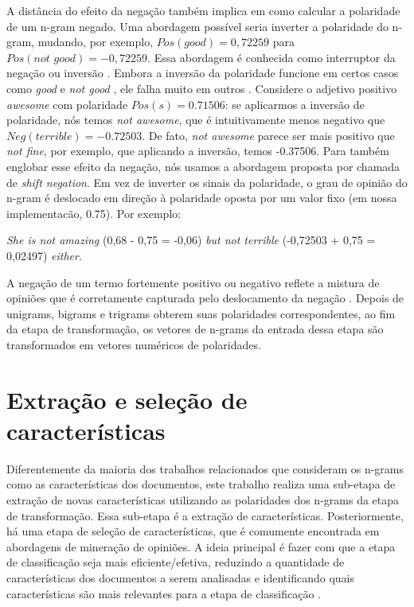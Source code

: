 A distância do efeito da negação também implica em como calcular a polaridade de um n-gram negado.  Uma abordagem possível seria inverter a polaridade do n-gram, mudando, por exemplo, $Pos(\textit{good}) = 0,72259$ para $Pos(\textit{not good}) = - 0,72259$. Essa abordagem é conhecida como interruptor da negação ou inversão \cite{sauri2008factuality}. Embora a inversão da polaridade funcione em certos casos como \textit{good} e \textit{not good} \cite{choi2008learning}, ele falha muito em outros \cite{liu2009review}. Considere o adjetivo positivo \textit{awesome} com polaridade $Pos(s) = 0.71506 $: se aplicarmos a inversão de polaridade, nós temos \textit{not awesome}, que é intuitivamente menos negativo que $Neg(\textit{terrible}) = -0.72503$. De fato, \textit{not awesome} parece ser mais positivo que \textit{not fine}, por exemplo, que aplicando a inversão, temos -0.37506. Para também englobar esse efeito da negação, nós usamos a abordagem proposta por  chamada de \textit{shift negation}. Em vez de inverter os sinais da polaridade, o grau de opinião do n-gram é deslocado em direção à polaridade oposta por um valor fixo (em nossa implementacão, 0.75). Por exemplo:

\begin{example}
\textit{She is not amazing} (0,68 - 0,75 = -0,06) \textit{but not terrible} (-0,72503 + 0,75 = 0,02497) \textit{either}.
\label{ex:shift_1}
\end{example}

A negação de um termo fortemente positivo ou negativo reflete a mistura de opiniões que é corretamente capturada pelo deslocamento da negação \cite{taboada2011lexicon}. Depois de unigrams, bigrams e trigrams obterem suas polaridades correspondentes, ao fim da etapa de transformação, os vetores de n-grams da entrada dessa etapa são transformados em vetores numéricos de polaridades.  

\section{Extração e seleção de características}

Diferentemente da maioria dos trabalhos relacionados que consideram os n-grams como as características dos documentos, este trabalho realiza uma sub-etapa de extração de novas características utilizando as polaridades dos n-grams da etapa de transformação. Essa sub-etapa é a extração de características. Posteriormente, há uma etapa de seleção de características, que é comumente encontrada em abordagens de mineração de opiniões. A ideia principal é fazer com que a etapa de classificação seja mais eficiente/efetiva, reduzindo a quantidade de características dos documentos a serem analisadas e identificando quais características são mais relevantes para a etapa de classificação \cite{moraes2012document}. 

